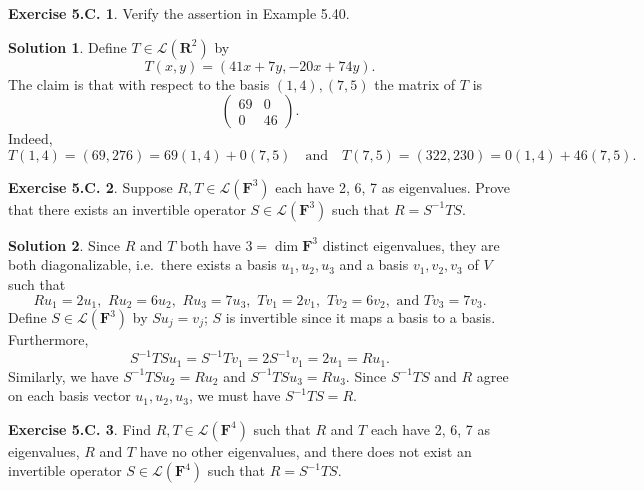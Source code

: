 \documentclass[12pt]{article}
\theoremstyle{definition}
\theoremstyle{exercise}
\newtheorem{exercise}{Exercise 5.C.}
\theoremstyle{solution}
\newtheorem*{solution}{Solution}
\newcommand{\lmap}{\mathcal{L}}
\newcommand{\quand}{\quad \text{and} \quad}
\newcommand{\R}{\mathbf{R}}
\newcommand{\F}{\mathbf{F}}
\begin{document}
\begin{exercise}
\label{ex:11}
    Verify the assertion in Example 5.40.
\end{exercise}

\begin{solution}
    Define \( T \in \lmap(\R^2) \) by
    \[
        T(x, y) = (41x + 7y, -20x + 74y).
    \]
    The claim is that with respect to the basis \( (1, 4), (7, 5) \) the matrix of \( T \) is
    \[
        \begin{pmatrix}
            69 & 0 \\
            0 & 46
        \end{pmatrix}.
    \]
    Indeed,
    \[
        T(1, 4) = (69, 276) = 69 (1, 4) + 0 (7, 5) \quand T(7, 5) = (322, 230) = 0 (1, 4) + 46 (7, 5).
    \]
\end{solution}

\begin{exercise}
\label{ex:12}
    Suppose \( R, T \in \lmap(\F^3) \) each have 2, 6, 7 as eigenvalues. Prove that there exists an invertible operator \( S \in \lmap(\F^3) \) such that \( R = S^{-1} T S \).
\end{exercise}

\begin{solution}
    Since \( R \) and \( T \) both have \( 3 = \dim \F^3 \) distinct eigenvalues, they are both diagonalizable, i.e.\ there exists a basis \( u_1, u_2, u_3 \) and a basis \( v_1, v_2, v_3 \) of \( V \) such that
    \[
        Ru_1 = 2u_1, \,\, Ru_2 = 6u_2, \,\, Ru_3 = 7u_3, \,\, Tv_1 = 2v_1, \,\, Tv_2 = 6v_2, \text{ and } Tv_3 = 7v_3.
    \]
    Define \( S \in \lmap(\F^3) \) by \( Su_j = v_j \); \( S \) is invertible since it maps a basis to a basis. Furthermore,
    \[
        S^{-1}TS u_1 = S^{-1}T v_1 = 2 S^{-1} v_1 = 2 u_1 = R u_1.
    \]
    Similarly, we have \( S^{-1}TS u_2 = R u_2 \) and \( S^{-1}TS u_3 = R u_3 \). Since \( S^{-1}TS \) and \( R \) agree on each basis vector \( u_1, u_2, u_3 \), we must have \( S^{-1}TS = R \).
\end{solution}

\begin{exercise}
\label{ex:13}
    Find \( R, T \in \lmap(\F^4) \) such that \( R \) and \( T \) each have 2, 6, 7 as eigenvalues, \( R \) and \( T \) have no other eigenvalues, and there does not exist an invertible operator \( S \in \lmap(\F^4) \) such that \( R = S^{-1}TS \).
\end{exercise}
\end{document}

